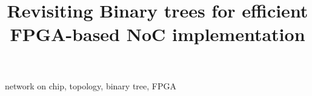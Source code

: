 \documentclass[conference,10pt,a4paper]{IEEEtran}
\begin{document}
\title{Revisiting Binary trees for efficient FPGA-based NoC implementation}

\maketitle



\begin{IEEEkeywords}
network on chip, topology, binary tree, FPGA
\end{IEEEkeywords}



%






 
\end{document}
